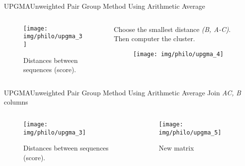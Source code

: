 \documentclass[10pt]{beamer}
\newcommand{\1}{
	\setbeamertemplate{background}{
		\texttt{[image: img/1]}
		\tikz[overlay] \fill[fill opacity=0.75,fill=white] (0,0) rectangle (-\paperwidth,\paperheight);
	}
}
\begin{document}
\begin{frame}{UPGMA}{Unweighted Pair Group Method Using Arithmetic Average}
	\begin{columns}
		\begin{column}{0.48\textwidth}
			\begin{figure}
				\texttt{[image: img/philo/upgma\_3]}
				\caption{Distances between sequences (score).}
			\end{figure}
		\end{column}
		\begin{column}{0.48\textwidth}
			
			Choose the smallest distance \textit{(B, A-C)}. Then computer the cluster.\\ 					
			
			\begin{figure}
				\texttt{[image: img/philo/upgma\_4]}
			\end{figure}
			
		\end{column}
	\end{columns}
	
\end{frame}

\begin{frame}{UPGMA}{Unweighted Pair Group Method Using Arithmetic Average}
	Join \textit{AC, B} columns
	\begin{columns}
		\begin{column}{0.48\textwidth}
			\begin{figure}
				\texttt{[image: img/philo/upgma\_3]}
				\caption{Distances between sequences (score).}
			\end{figure}
		\end{column}
		\begin{column}{0.48\textwidth}	
			\begin{figure}
				\texttt{[image: img/philo/upgma\_5]}
				\caption{New matrix}
			\end{figure}			
		\end{column}
	\end{columns}
	
\end{frame}
\end{document}
